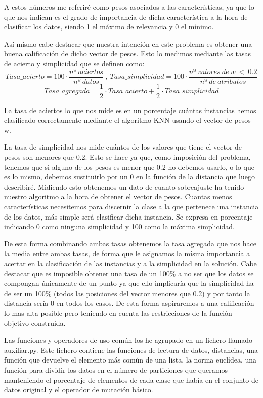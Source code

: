 \documentclass[12pt,a4paper]{article}
\begin{document}
	A estos números me referiré como pesos asociados a las características, ya que lo que nos indican es el grado de importancia de dicha característica a la hora de clasificar los datos, siendo 1 el máximo de relevancia y 0 el mínimo.
	
	Así mismo cabe destacar que nuestra intención en este problema es obtener una buena calificación de dicho vector de pesos. Esto lo medimos mediante las tasas de acierto y simplicidad que se definen como:
	$$Tasa\_acierto = 100\cdot \frac{nº  \ aciertos}{nº \ datos} \ , \ Tasa\_simplicidad = 100\cdot \frac{nº \ valores \ de \ w \ < \ 0.2}{nº \ de \ atributos}$$
	$$Tasa\_agregada = \frac{1}{2}\cdot Tasa\_acierto + \frac{1}{2}\cdot Tasa\_simplicidad$$
	
	La tasa de aciertos lo que nos mide es en un porcentaje cuántas instancias hemos clasificado correctamente mediante el algoritmo KNN usando el vector de pesos w.
	
	La tasa de simplicidad nos mide cuántos de los valores que tiene el vector de pesos son menores que 0.2. Esto se hace ya que, como imposición del problema, tenemos que si alguno de los pesos es menor que 0.2 no debemos usarlo, o lo que es lo mismo, debemos sustituirlo por un 0 en la función de la distancia que luego describiré. Midiendo esto obtenemos un dato de cuanto sobreajuste ha tenido nuestro algoritmo a la hora de obtener el vector de pesos. Cuantas menos características necesitemos para discernir la clase a la que pertenece una instancia de los datos, más simple será clasificar dicha instancia. Se expresa en porcentaje indicando 0 como ninguna simplicidad y 100 como la máxima simplicidad.
	
	De esta forma combinando ambas tasas obtenemos la tasa agregada que nos hace la media entre ambas tasas, de forma que le asignamos la misma importancia a acertar en la clasificación de las instancias y a la simplicidad en la solución. Cabe destacar que es imposible obtener una tasa de un 100\% a no ser que los datos se compongan únicamente de un punto ya que ello implicaría que la simplicidad ha de ser un 100\% (todos las posiciones del vector menores que 0.2) y por tanto la distancia sería 0 en todos los casos. De esta forma aspiraremos a una calificación lo mas alta posible pero teniendo en cuenta las restricciones de la función objetivo construida.
	
	Las funciones y operadores de uso común los he agrupado en un fichero llamado auxiliar.py. Este fichero contiene las funciones de lectura de datos, distancias, una función que devuelve el elemento más común de una lista, la norma euclídea, una función para dividir los datos en el número de particiones que queramos manteniendo el porcentaje de elementos de cada clase que había en el conjunto de datos original y el operador de mutación básico.
	
\end{document}
